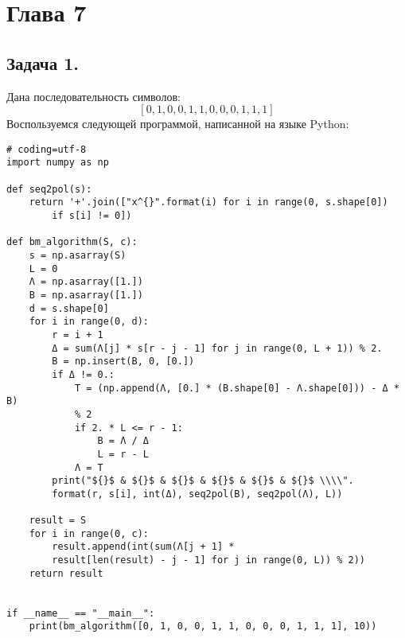 \documentclass{article}
\begin{document}
\section{Глава 7}
%
\subsection{Задача 1.}
%
Дана последовательность символов:
$$[0, 1, 0, 0, 1, 1, 0, 0, 0, 1, 1, 1]$$
Воспользуемся следующей программой, написанной на языке Python:
\begin{lstlisting}[frame=single]
# coding=utf-8
import numpy as np

def seq2pol(s):
    return '+'.join(["x^{}".format(i) for i in range(0, s.shape[0]) 
        if s[i] != 0])

def bm_algorithm(S, c):
    s = np.asarray(S)
    L = 0
    Λ = np.asarray([1.])
    B = np.asarray([1.])
    d = s.shape[0]
    for i in range(0, d):
        r = i + 1
        Δ = sum(Λ[j] * s[r - j - 1] for j in range(0, L + 1)) % 2.
        B = np.insert(B, 0, [0.])
        if Δ != 0.:
            T = (np.append(Λ, [0.] * (B.shape[0] - Λ.shape[0])) - Δ * B) 
            % 2
            if 2. * L <= r - 1:
                B = Λ / Δ
                L = r - L
            Λ = T
        print("${}$ & ${}$ & ${}$ & ${}$ & ${}$ & ${}$ \\\\".
        format(r, s[i], int(Δ), seq2pol(B), seq2pol(Λ), L))

    result = S
    for i in range(0, c):
        result.append(int(sum(Λ[j + 1] * 
        result[len(result) - j - 1] for j in range(0, L)) % 2))
    return result


if __name__ == "__main__":
    print(bm_algorithm([0, 1, 0, 0, 1, 1, 0, 0, 0, 1, 1, 1], 10))


\end{lstlisting}
%
\end{document}
